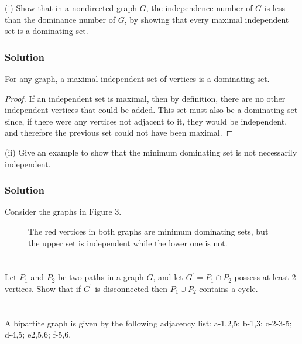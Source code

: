 \documentclass{amsart}
\begin{document}
(i) Show that in a nondirected graph $G$, the independence number of $G$ is less
than the dominance number of $G$, by showing that every maximal independent
set is a dominating set.
\subsubsection*{Solution}
For any graph, a maximal independent set of vertices is a dominating set.
\begin{proof}
  If an independent set is maximal, then by definition, there are no other
  independent vertices that could be added.
  This set must also be a dominating set since, if there were any vertices not
  adjacent to it, they would be independent, and therefore the previous set could
  not have been maximal.
\end{proof}

(ii) Give an example to show that the minimum dominating set is not necessarily
independent.
\subsubsection*{Solution}
Consider the graphs in Figure 3.
\begin{figure}[!h]
  \label{fig:mindom}
  \caption{
The red vertices in both graphs are minimum dominating sets, but the upper set is independent while
the lower one is not.}
\end{figure}

\section{}

Let $P_1$ and $P_2$ be two paths in a graph $G$, and let $G^\prime=P_1 \cap P_2$ possess at least 2
vertices.
Show that if $G^\prime$ is disconnected then $P_1\cup P_2$ contains a cycle.

\section{}
A bipartite graph is given by the following adjacency list: a-1,2,5; b-1,3; c-2-3-5; d-4,5; e2,5,6; f-5,6.
\end{document}
